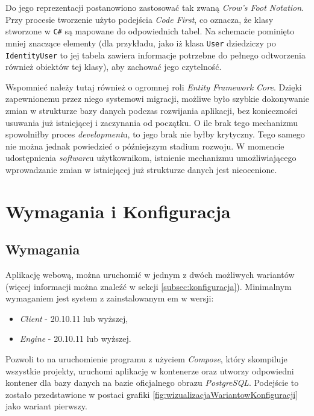 \par Do jego reprezentacji postanowiono zastosować tak zwaną \emph{Crow's Foot Notation}. Przy procesie tworzenie użyto podejścia \emph{Code First}, co oznacza, że klasy stworzone w \texttt{C\#} są mapowane do odpowiednich tabel. Na schemacie pominięto mniej znaczące elementy (dla przykładu, jako iż klasa \texttt{User} dziedziczy po \texttt{IdentityUser} to jej tabela zawiera informacje potrzebne do pełnego odtworzenia również obiektów tej klasy), aby zachować jego czytelność.

\par Wspomnieć należy tutaj również o ogromnej roli \emph{Entity Framework Core}. Dzięki zapewnionemu przez niego systemowi migracji, możliwe było szybkie dokonywanie zmian w strukturze bazy danych podczas rozwijania aplikacji, bez konieczności usuwania już istniejącej i zaczynania od początku. O ile brak tego mechanizmu spowolniłby proces \emph{development}u, to jego brak nie byłby krytyczny. Tego samego nie można jednak powiedzieć o późniejszym stadium rozwoju. W momencie udostępnienia \emph{software}u użytkownikom, istnienie mechanizmu umożliwiającego wprowadzanie zmian w istniejącej już strukturze danych jest nieocenione.

\section{Wymagania i Konfiguracja}
\label{sec:wymaganiaIKonfiguracja}

\subsection{Wymagania}
\par Aplikację webową, można uruchomić w jednym z dwóch możliwych wariantów (więcej informacji można znaleźć w sekcji \ref{subsec:konfiguracja}). Minimalnym wymaganiem jest system z zainstalowanym \emph{\docker}em w wersji:

\begin{itemize}
	\item \emph{\docker{} Client} - 20.10.11 lub wyższej,
	\item \emph{\docker{} Engine} - 20.10.11 lub wyższej.
\end{itemize}

\par Pozwoli to na uruchomienie programu z użyciem \emph{\docker{} Compose}, który skompiluje wszystkie projekty, uruchomi aplikację w kontenerze oraz utworzy odpowiedni kontener dla bazy danych na bazie oficjalnego obrazu \emph{PostgreSQL}. Podejście to zostało przedstawione w postaci grafiki \ref{fig:wizualizacjaWariantowKonfiguracji} jako wariant pierwszy.

